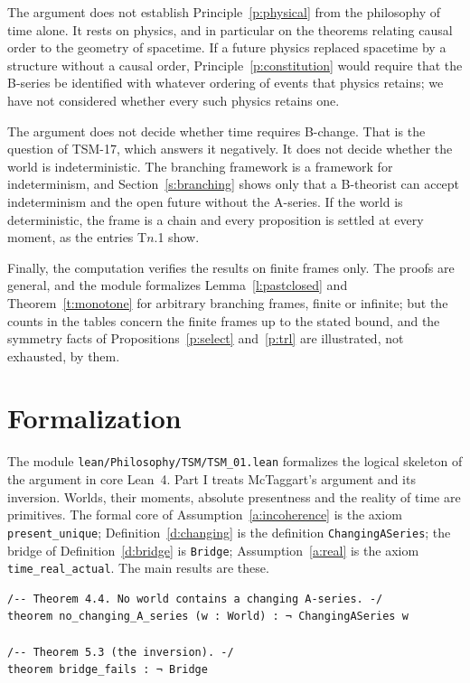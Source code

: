 \documentclass{situationist-preprint}
\begin{document}
The argument does not establish Principle~\ref{p:physical} from the philosophy of time alone. It rests on physics, and in particular on the theorems relating causal order to the geometry of spacetime. If a future physics replaced spacetime by a structure without a causal order, Principle~\ref{p:constitution} would require that the B-series be identified with whatever ordering of events that physics retains; we have not considered whether every such physics retains one.

The argument does not decide whether time requires B-change. That is the question of TSM-17, which answers it negatively. It does not decide whether the world is indeterministic. The branching framework is a framework for indeterminism, and Section~\ref{s:branching} shows only that a B-theorist can accept indeterminism and the open future without the A-series. If the world is deterministic, the frame is a chain and every proposition is settled at every moment, as the entries T$n$.1 show.

Finally, the computation verifies the results on finite frames only. The proofs are general, and the module formalizes Lemma~\ref{l:pastclosed} and Theorem~\ref{t:monotone} for arbitrary branching frames, finite or infinite; but the counts in the tables concern the finite frames up to the stated bound, and the symmetry facts of Propositions~\ref{p:select} and~\ref{p:trl} are illustrated, not exhausted, by them.

\section{Formalization}\label{s:formal}

The module \texttt{lean/Philosophy/TSM/TSM\_01.lean} formalizes the logical skeleton of the argument in core Lean~4. Part I treats McTaggart's argument and its inversion. Worlds, their moments, absolute presentness and the reality of time are primitives. The formal core of Assumption~\ref{a:incoherence} is the axiom \texttt{present\_unique}; Definition~\ref{d:changing} is the definition \texttt{ChangingASeries}; the bridge of Definition~\ref{d:bridge} is \texttt{Bridge}; Assumption~\ref{a:real} is the axiom \texttt{time\_real\_actual}. The main results are these.

\begin{lstlisting}
/-- Theorem 4.4. No world contains a changing A-series. -/
theorem no_changing_A_series (w : World) : ¬ ChangingASeries w

/-- Theorem 5.3 (the inversion). -/
theorem bridge_fails : ¬ Bridge
\end{lstlisting}
\end{document}
